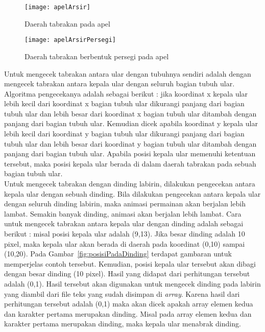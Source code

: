 \begin{figure}[H]
	\centering  
	\texttt{[image: apelArsir]}  
	\caption[Daerah tabrakan pada apel]{Daerah tabrakan pada apel}
	\label{fig:apelArsir} 
\end{figure}

\begin{figure}[H]
	\centering  
	\texttt{[image: apelArsirPersegi]}  
	\caption[Daerah tabrakan berbentuk persegi pada apel]{Daerah tabrakan berbentuk persegi pada apel}
	\label{fig:apelArsirPersegi} 
\end{figure}

Untuk mengecek tabrakan antara ular dengan tubuhnya sendiri adalah dengan mengecek tabrakan antara kepala ular dengan seluruh bagian tubuh ular. Algoritma pengecekanya adalah sebagai berikut : jika koordinat x kepala ular lebih kecil dari koordinat x bagian tubuh ular dikurangi panjang dari bagian tubuh ular dan lebih besar dari koordinat x bagian tubuh ular ditambah dengan panjang dari bagian tubuh ular. Kemudian dicek apabila koordinat y kepala ular lebih kecil dari koordinat y bagian tubuh ular dikurangi panjang dari bagian tubuh ular dan lebih besar dari koordinat y bagian tubuh ular ditambah dengan panjang dari bagian tubuh ular. Apabila posisi kepala ular memenuhi ketentuan tersebut, maka posisi kepala ular berada di dalam daerah tabrakan pada sebuah bagian tubuh ular.\\

Untuk mengecek tabrakan dengan dinding labirin, dilakukan pengecekan antara kepala ular dengan sebuah dinding. Bila dilakukan pengecekan antara kepala ular dengan seluruh dinding labirin, maka animasi permainan akan berjalan lebih lambat. Semakin banyak dinding, animasi akan berjalan lebih lambat. Cara untuk mengecek tabrakan antara kepala ular dengan dinding adalah sebagai berikut : misal posisi kepala ular adalah (9,13). Jika besar dinding adalah 10 pixel, maka kepala ular akan berada di daerah pada koordinat (0,10) sampai (10,20). Pada Gambar~\ref{fig:posisiPadaDinding} terdapat gambaran untuk memperjelas contoh tersebut. Kemudian, posisi kepala ular tersebut akan dibagi dengan besar dinding (10 pixel). Hasil yang didapat dari perhitungan tersebut adalah (0,1). Hasil tersebut akan digunakan untuk mengecek dinding pada labirin yang diambil dari file teks yang sudah disimpan di \textit{array}. Karena hasil dari perhitungan tersebut adalah (0,1) maka akan dicek apakah array elemen kedua dan karakter pertama merupakan dinding. Misal pada array elemen kedua dan karakter pertama merupakan dinding, maka kepala ular menabrak dinding.

